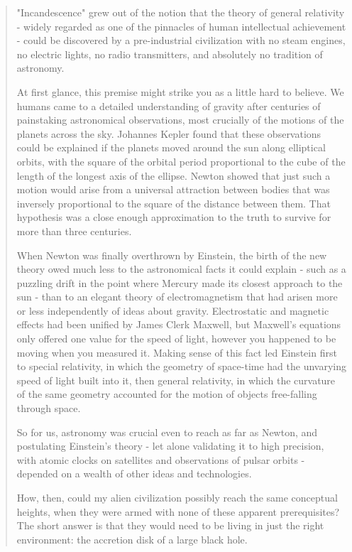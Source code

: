 \begin{quote}
  "Incandescence" grew out of the notion that the theory of general 
  relativity - widely regarded as one of the pinnacles of human 
  intellectual achievement - could be discovered by a pre-industrial 
  civilization with no steam engines, no electric lights, no radio 
  transmitters, and absolutely no tradition of astronomy.

  At first glance, this premise might strike you as a little hard 
  to believe.  We humans came to a detailed understanding of gravity 
  after centuries of painstaking astronomical observations, most 
  crucially of the motions of the planets across the sky.  Johannes 
  Kepler found that these observations could be explained if the 
  planets moved around the sun along elliptical orbits, with the 
  square of the orbital period proportional to the cube of the 
  length of the longest axis of the ellipse.  Newton showed 
  that just such a motion would arise from a universal attraction 
  between bodies that was inversely proportional to the square of 
  the distance between them.  That hypothesis was a close enough 
  approximation to the truth to survive for more than three centuries.

  When Newton was finally overthrown by Einstein, the birth of the 
  new theory owed much less to the astronomical facts it could explain -
  such as a puzzling drift in the point where Mercury made its closest 
  approach to the sun - than to an elegant theory of electromagnetism 
  that had arisen more or less independently of ideas about gravity. 
  Electrostatic and magnetic effects had been unified by James Clerk 
  Maxwell, but Maxwell's equations only offered one value for the speed 
  of light, however you happened to be moving when you measured it. 
  Making sense of this fact led Einstein first to special relativity, 
  in which the geometry of space-time had the unvarying speed of light 
  built into it, then general relativity, in which the curvature of the 
  same geometry accounted for the motion of objects free-falling 
  through space.

  So for us, astronomy was crucial even to reach as far as Newton, and 
  postulating Einstein's theory - let alone validating it to high 
  precision, with atomic clocks on satellites and observations of 
  pulsar orbits - depended on a wealth of other ideas and technologies.
 
  How, then, could my alien civilization possibly reach the same 
  conceptual heights, when they were armed with none of these apparent 
  prerequisites?   The short answer is that they would need to be 
  living in just the right environment: the accretion disk of a large 
  black hole.


\end{quote}
